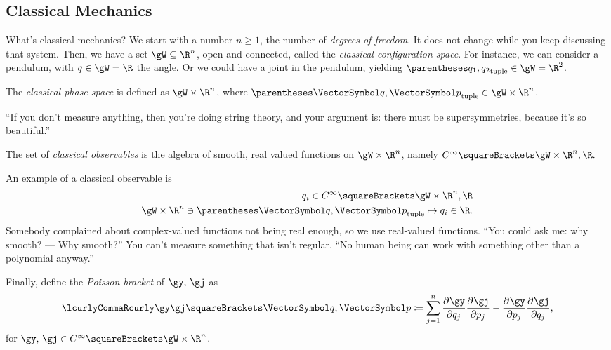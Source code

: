 \documentclass[10pt, a4paper, twoside]{lecturenotes}
\newcommand{\Rn}{{\R^n}}
\begin{document}
\subsection{Classical Mechanics}
\begin{lecture}[date=2013-04-11]
What's classical mechanics? We start with a number $n\geq 1$, the number of \emph{degrees of freedom}. It does not change while you keep discussing that system. Then, we have a set $\gW \Subset \Rn$, open and connected, called the \emph{classical configuration space}.
For instance, we can consider a pendulum, with $q\in\gW = \R$ the angle. Or we could have a joint in the pendulum, yielding $\tuple{q_1,q_2}\in\gW=\R^2$.
\marginfig[The configuration space $\gW=\R^2$ of a double pendulum, where $\vq=\tuple{q_1,q_2}\in\R^2$.]{\FigureSimplePendulumConfigurationSpace}
\marginfig[The configuration space $\gW=\R$ of a simple pendulum. Here $q\in\R$, as the pendulum can do a full turn --- or several --- around its pivot.]{\FigureDoublePendulumConfigurationSpace}
\marginpar{\vspace*{3cm}}
\begin{definition} The \emph{classical phase space} is defined as $\gW \Cartesian \Rn$, where $\tuple{\vq,\vp}\in\gW \Cartesian \Rn$.
\end{definition}
``If you don't measure anything, then you're doing string theory, and your argument is: there must be supersymmetries, because it's so beautiful.''
\begin{definition} The set of \emph{classical observables} is the algebra of smooth, real valued functions on $\gW\Cartesian\Rn$, namely $\Continf\of{\gW\Cartesian\Rn, \R} \text.$
\end{definition}
An example of a classical observable is
\begin{align*}
q_i\in\Continf\of{\gW\Cartesian\Rn, \R}\\
\FunctionBody{\gW\Cartesian\Rn\owns\tuple{\vq,\vp}}{q_i\in\R}\text.
\end{align*}
Somebody complained about complex-valued functions not being real enough, so we use real-valued functions.
``You could ask me: why smooth? --- Why smooth?'' You can't measure something that isn't regular. ``No human being can work with something other than a polynomial anyway.''
\begin{definition}
Finally, define the \emph{Poisson bracket} of $\gy\text{, }\gj$ as
\[
\Poisson{\gy}{\gj}\of{\vq,\vp} \DefineAs \sum{j=1}[n]{\pderiv {q_j}\gy \pderiv {p_j} \gj-\pderiv {p_j}\gy \pderiv {q_j}\gj}
\text,
\]
for $\gy\text{, }\gj\in\Continf\of{\gW\Cartesian\Rn}$.
\end{definition}


\end{lecture}
\end{document}
